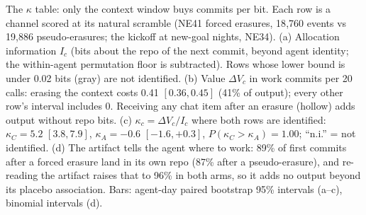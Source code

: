 \caption{The $\kappa$ table: only the context window buys commits per bit.
Each row is a channel scored at its natural scramble (NE41 forced erasures, 18{,}760 events vs 19{,}886 pseudo-erasures; the kickoff at new-goal nights, NE34).
(a) Allocation information $I_c$ (bits about the repo of the next commit, beyond agent identity; the within-agent permutation floor is subtracted). Rows whose lower bound is under 0.02 bits (gray) are not identified.
(b) Value $\Delta V_c$ in work commits per 20 calls: erasing the context costs 0.41 $[0.36, 0.45]$ (41\% of output); every other row's interval includes 0. Receiving any chat item after an erasure (hollow) adds output without repo bits.
(c) $\kappa_c=\Delta V_c/I_c$ where both rows are identified: $\kappa_C = 5.2$ $[3.8, 7.9]$, $\kappa_A = -0.6$ $[-1.6, +0.3]$, $P(\kappa_C>\kappa_A)=1.00$; ``n.i.'' = not identified.
(d) The artifact tells the agent where to work: 89\% of first commits after a forced erasure land in its own repo (87\% after a pseudo-erasure), and re-reading the artifact raises that to 96\% in both arms, so it adds no output beyond its placebo association. Bars: agent-day paired bootstrap 95\% intervals (a--c), binomial intervals (d).}
\label{fig:H87}
